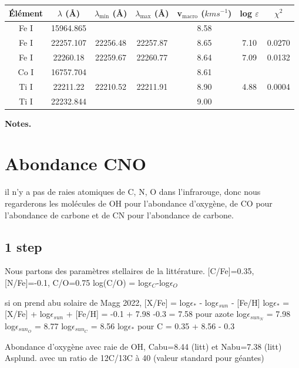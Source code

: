 \documentclass{article}
\begin{document}
\begin{table}[h!]
\vspace{0.3cm}

\begin{center}
	\begin{tabular}{ccccccc}
        \hline
		\hline
        Élément & $\lambda$ (Å) & $\lambda_{\mathrm{min}}$ (Å) & $\lambda_{\mathrm{max}}$ (Å)& v$_{\mathrm{macro}}$ ($km s^{-1}$) & log $\varepsilon$ & $\chi^2$\\
        \hline
    Fe I & 15964.865 &&& 8.58 && \\
    Fe I & 22257.107 &22256.48&22257.87& 8.65 &7.10& 0.0270\\
    Fe I & 22260.18 &22259.67&22260.77& 8.64 & 7.09 & 0.0132\\
		Co I & 16757.704&& & 8.61 && \\
		Ti I & 22211.22 & 22210.52 & 22211.91 & 8.90 & 4.88 & 0.0004\\
		Ti I & 22232.844&& & 9.00 &&\\
    \end{tabular}
\end{center} 
\textbf{Notes.} 
\label{macro}
\end{table}

\section{Abondance CNO}
il n'y a pas de raies atomiques de C, N, O dans l'infrarouge, donc nous regarderons les molécules de OH pour l'abondance d'oxygène, de CO pour l'abondance de carbone et de CN pour l'abondance de carbone. 
\subsection{1 step} 
Nous partons des paramètres stellaires de la littérature. [C/Fe]=0.35, [N/Fe]=-0.1, C/O=0.75
 log(C/O) = log$\epsilon_C$-log$\epsilon_O$

si on prend abu solaire de Magg 2022, 
[X/Fe] = log$\epsilon_*$ - log$\epsilon_{sun}$ - [Fe/H]
log$\epsilon_*$ = [X/Fe] + log$\epsilon_{sun}$ + [Fe/H]
= -0.1 + 7.98 -0.3 = 7.58 pour azote
log$\epsilon_{sun_N}$ = 7.98
log$\epsilon_{sun_O}$ = 8.77
log$\epsilon_{sun_C}$ = 8.56
log$\epsilon_*$ pour C = 0.35 + 8.56 - 0.3

Abondance d'oxygène avec raie de OH, Cabu=8.44 (litt) et Nabu=7.38 (litt) Asplund. 
avec un ratio de 12C/13C à 40 (valeur standard pour géantes)
\end{document}

